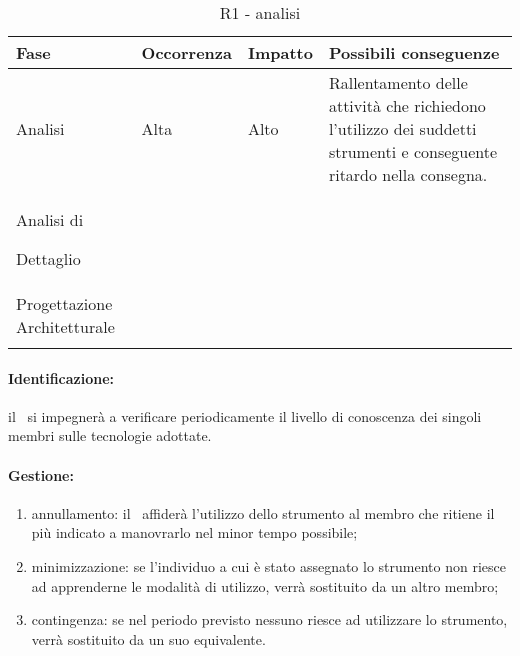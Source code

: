 \documentclass[../PianoProgetto.tex]{subfiles}
\begin{document}

	\begin{table} [h]
		\centering
		\begin{tabularx}{\textwidth}{F O O P}
			\toprule
			\textbf{Fase} & \textbf{Occorrenza} & \textbf{Impatto} & \textbf{Possibili conseguenze}\\
			\midrule
			Analisi & Alta & Alto & Rallentamento delle attività che richiedono l'utilizzo dei suddetti strumenti e conseguente ritardo nella consegna. \\
			\midrule
			Analisi di \par Dettaglio & & & \\
			\midrule
			Progettazione Architetturale & & & \\
			\bottomrule
		\end{tabularx}
		\caption{R1 - analisi}
		\label{tab:R1-analisi}	
	\end{table}	
	
	\paragraph*{Identificazione:} il \responsabilediprogetto\ si impegnerà a verificare periodicamente il livello di conoscenza dei singoli membri sulle tecnologie adottate.
	
	\paragraph*{Gestione:}
	\begin{enumerate}
		\item annullamento: il \responsabilediprogetto\ affiderà l'utilizzo dello strumento al membro che ritiene il più indicato a manovrarlo nel minor tempo possibile;
		\item minimizzazione: se l'individuo a cui è stato assegnato lo strumento non riesce ad apprenderne le modalità di utilizzo, verrà sostituito da un altro membro;
		\item contingenza: se nel periodo previsto nessuno riesce ad utilizzare lo strumento, verrà sostituito da un suo equivalente. 
	\end{enumerate}		
	
\end{document}
